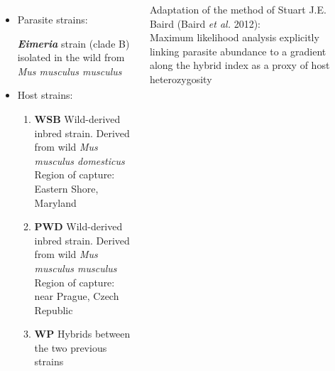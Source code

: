 \documentclass[30pt, a0paper, portrait, margin=0mm, innermargin=15mm,
               blockverticalspace=15mm, colspace=15mm, subcolspace=8mm]{tikzposter}
\begin{document}
\begin{columns}
{    }


      {
      \begin{itemize}
      
      \item Parasite strains:
      
      \textbf{\textit{Eimeria}} strain (clade B) isolated in the wild from \textit{Mus musculus musculus}
      
      \item Host strains:
      
      \begin{enumerate}
      \item \textbf{WSB} Wild-derived inbred strain. Derived from wild \textit{Mus musculus domesticus}\\ Region of capture: Eastern Shore, Maryland
      \item \textbf{PWD} Wild-derived inbred strain. Derived from wild \textit{Mus musculus musculus}\\ Region of capture: near Prague, Czech Republic
      \item \textbf{WP} Hybrids between the two previous strains
      \end{enumerate}
      
      \end{itemize}
}






{

\vfill
  \item Adaptation of the method of Stuart J.E. Baird (Baird \textit{et al.} 2012): \\ Maximum likelihood analysis explicitly linking parasite abundance to a gradient along the hybrid index as a proxy of host heterozygosity  \vspace{+1ex}
  
}
\end{columns}
\end{document}
